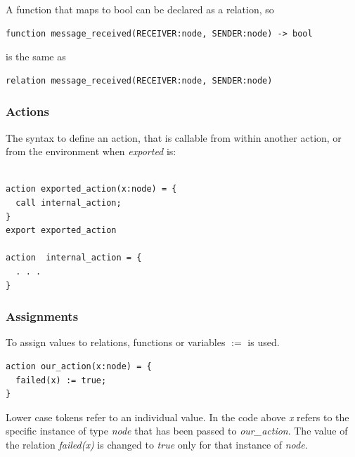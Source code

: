 \documentclass[fleqn]{article}
\begin{document}
\noindent A function that maps to bool can be declared as a relation, so

\begin{mdframed}[backgroundcolor=light-gray, roundcorner=10pt,leftmargin=1, rightmargin=1, innerleftmargin=15, innertopmargin=15,innerbottommargin=15, outerlinewidth=1, linecolor=light-gray]
\begin{lstlisting}
function message_received(RECEIVER:node, SENDER:node) -> bool
\end{lstlisting}
\end{mdframed}

\noindent is the same as

\begin{mdframed}[backgroundcolor=light-gray, roundcorner=10pt,leftmargin=1, rightmargin=1, innerleftmargin=15, innertopmargin=15,innerbottommargin=15, outerlinewidth=1, linecolor=light-gray]
\begin{lstlisting}
relation message_received(RECEIVER:node, SENDER:node)
\end{lstlisting}
\end{mdframed}

\subsubsection{Actions}
The syntax to define an action, that is callable from within another action, or from the environment when \textit{exported} is:

\begin{mdframed}[backgroundcolor=light-gray, roundcorner=10pt,leftmargin=1, rightmargin=1, innerleftmargin=15, innertopmargin=15,innerbottommargin=15, outerlinewidth=1, linecolor=light-gray]
\begin{lstlisting}

action exported_action(x:node) = {
  call internal_action;
}
export exported_action

action  internal_action = {
  . . .
}
\end{lstlisting}
\end{mdframed}

\subsubsection{Assignments}

To assign values to relations, functions or variables $:=$ is used.
\begin{mdframed}[backgroundcolor=light-gray, roundcorner=10pt,leftmargin=1, rightmargin=1, innerleftmargin=15, innertopmargin=15,innerbottommargin=15, outerlinewidth=1, linecolor=light-gray]
\begin{lstlisting}
action our_action(x:node) = {
  failed(x) := true;
}
\end{lstlisting}
\end{mdframed}
Lower case tokens refer to an individual value. In the code above \textit{x} refers to the specific instance of type \textit{node} that has been passed to \textit{our\_action}. The value of the relation \textit{failed(x)} is changed to \textit{true} only for that instance of \textit{node}.
\end{document}
